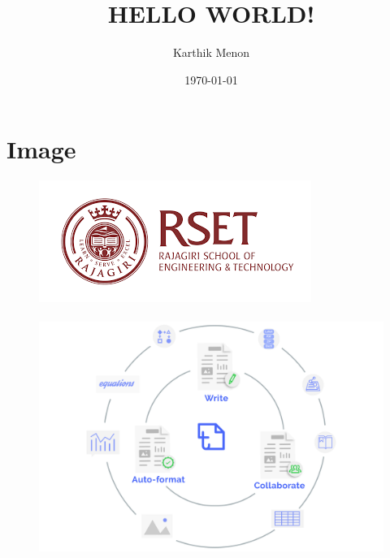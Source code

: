 \documentclass[a4paper,12pt]{article}
\begin{document}
\title{HELLO WORLD!}
\author{Karthik Menon}
\date{\today}
\maketitle
\newpage
\tableofcontents
\newpage
\section{Image}
\begin{figure}[h]
	\centering
		\includegraphics[scale=1]{../images/index.png} \\ \\
		\includegraphics[scale=0.2]{../images/home.png} \\
\end{figure}
\end{document}
